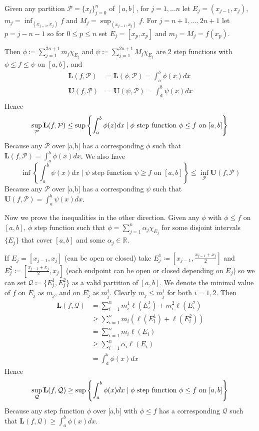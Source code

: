 \documentclass[11pt]{article}
\newcommand{\R}{\mathbb{R}}
\newcommand{\Par}{\mathcal{P}}
\newcommand{\Qu}{\mathcal{Q}}
\newcommand{\Lo}{\mathbf{L}}
\newcommand{\U}{\mathbf{U}}
\begin{document}
    Given any partition $\Par = \{ x_j \}_{j=0}^{n}$ of $[a,b]$, for $j= 1, \hdots n$ let $E_j = (x_{j-1}, x_j)$, $m_j = \inf_{(x_{j-1}, x_j)} f$ and $ M_j = \sup_{(x_{j-1}, x_j)} f$.
    For $j = n+1, \hdots, 2n+1$ let $p=j-n-1$ so for $0 \leq p \leq n$ set $E_{j} = [x_p,x_p]$ and $m_j = M_j = f(x_p)$.

    Then $\phi \coloneqq \sum_{j=1}^{2n+1} m_{j} \chi_{E_j}$ and $\psi \coloneqq \sum_{j=1}^{2n+1} M_{j} \chi_{E_j}$ are 2 step functions with $\phi \leq f \leq \psi$ on $[a,b]$, and
    \begin{align*}
        \Lo (f,\Par) &= \Lo (\phi, \Par) = \int_{a}^{b} \phi(x) dx \tag{Since $\ell (E_j) = 0$ for $n+1 \leq j \leq 2n + 1$} \\
        \U (f,\Par) &= \U (\psi, \Par) = \int_{a}^{b} \psi (x) dx \\
    \end{align*}
    Hence
    \[
        \sup_{\Par} \Lo (f, \Par) \leq \sup \left\{  \int_{a}^{b} \phi (x) dx \mid \phi \text{ step function } \phi \leq f \text{ on } [a,b] \right\} \\
    \]
    Because any $\Par$ over [a,b] has a corresponding $\phi$ such that $\Lo (f,\Par) = \int_{a}^{b} \phi (x) dx$.
    We also have
    \[
        \inf \left\{ \int_{a}^{b} \psi (x) dx \mid \psi \text{ step function } \psi \geq f \text{ on } [a,b] \right\} \leq \inf_{\Par} \U (f, \Par)
    \]
    Because any $\Par$ over [a,b] has a corresponding $\psi$ such that $\U (f,\Par) = \int_{a}^{b} \psi (x) dx$.

    Now we prove the inequalities in the other direction.
    Given any $\phi$ with $\phi \leq f$ on $[a,b]$, $\phi$ step function such that $\phi = \sum_{j=1}^{n} \alpha_j \chi_{E_j}$ for some disjoint intervals $\{ E_j \}$ that cover $[a,b]$ and some $\alpha_j \in \R$.

    If $E_j = [x_{j-1}, x_j]$ (can be open or closed) take $E_j ^1 \coloneqq [x_{j-1}, \frac{x_{j-1} + x_j}{2}]$ and $E_j ^2 \coloneqq [\frac{x_{j-1} + x_j}{2}, x_j]$ (each endpoint can be open or closed depending on $E_j$) so we can set $\Qu \coloneqq \{ E_j ^1, E_j ^2 \}$ as a valid partition of $[a,b]$.
    We denote the minimal value of $f$ on $E_j$ as $m_j$, and on $E_j ^i$ as $m_j ^i$.
    Clearly $m_j \leq m_j ^i$ for both $i=1,2$.
    Then
    \begin{align*}
        \Lo (f, \Qu) &= \sum_{i=1}^{n} m_i ^1 \ell (E_i ^1) + m_i ^2 \ell (E_i ^2) \\
        &\geq \sum_{i=1}^{n} m_i (\ell (E_i ^1) + \ell (E_i ^2) ) \\
        &= \sum_{i=1}^{n} m_i \ell (E_i) \\
        & \geq \sum_{i=1}^{n} \alpha_i \ell (E_i) \tag{$\phi \leq f$} \\
        &= \int_{a}^{b} \phi (x) dx
    \end{align*}
    Hence
    \[
        \sup_{\Qu} \Lo (f, \Qu) \geq \sup \left\{  \int_{a}^{b} \phi (x) dx \mid \phi \text{ step function } \phi \leq f \text{ on } [a,b] \right\} \\
    \]
    Because any step function $\phi$ over [a,b] with $\phi \leq f$ has a corresponding $\Qu$ such that $\Lo (f,\Qu) \geq \int_{a}^{b} \phi (x) dx$.
\end{document}
